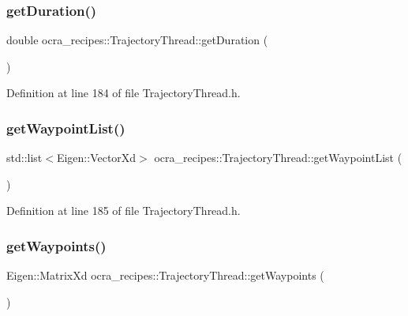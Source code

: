 \subsubsection{\texorpdfstring{get\+Duration()}{getDuration()}}
{\footnotesize\ttfamily double ocra\+\_\+recipes\+::\+Trajectory\+Thread\+::get\+Duration (\begin{DoxyParamCaption}{ }\end{DoxyParamCaption})\hspace{0.3cm}{\ttfamily [inline]}}



Definition at line 184 of file Trajectory\+Thread.\+h.

\hypertarget{classocra__recipes_1_1TrajectoryThread_a78ac745efb132b69d7129f1e9212ad87}{}\label{classocra__recipes_1_1TrajectoryThread_a78ac745efb132b69d7129f1e9212ad87} 
\subsubsection{\texorpdfstring{get\+Waypoint\+List()}{getWaypointList()}}
{\footnotesize\ttfamily std\+::list$<$Eigen\+::\+Vector\+Xd$>$ ocra\+\_\+recipes\+::\+Trajectory\+Thread\+::get\+Waypoint\+List (\begin{DoxyParamCaption}{ }\end{DoxyParamCaption})\hspace{0.3cm}{\ttfamily [inline]}}



Definition at line 185 of file Trajectory\+Thread.\+h.

\hypertarget{classocra__recipes_1_1TrajectoryThread_ae6830df6ce18f3a6f5656fe345b05731}{}\label{classocra__recipes_1_1TrajectoryThread_ae6830df6ce18f3a6f5656fe345b05731} 
\subsubsection{\texorpdfstring{get\+Waypoints()}{getWaypoints()}}
{\footnotesize\ttfamily Eigen\+::\+Matrix\+Xd ocra\+\_\+recipes\+::\+Trajectory\+Thread\+::get\+Waypoints (\begin{DoxyParamCaption}{ }\end{DoxyParamCaption})\hspace{0.3cm}{\ttfamily [inline]}}



